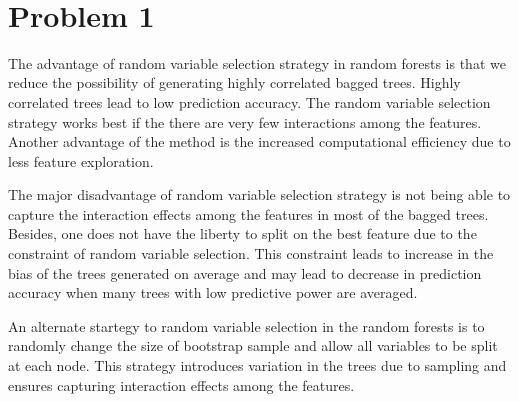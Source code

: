 \documentclass[11pt]{article}
\begin{document}
\begin{center}

\ \\
\end{center}

\section*{Problem 1}

\vspace{5 mm}
\noindent
The advantage of random variable selection strategy in random forests is that
we reduce the possibility of generating highly correlated bagged trees. Highly
correlated trees lead to low prediction accuracy. The random variable selection 
strategy works best if the there are very few interactions among the features.
Another advantage of the method is the increased computational efficiency due to
less feature exploration. 

The major disadvantage of random variable selection strategy is not being able to 
capture the interaction effects among the features in most of the bagged trees. 
Besides, one does not have the liberty to split on the best feature due to the constraint
of random variable selection. This constraint leads to increase in the bias of the trees
generated on average and may lead to decrease in prediction accuracy when many 
trees with low predictive power are averaged.

An alternate startegy to random variable selection in the random forests is to 
randomly change the size of bootstrap sample and allow all variables to be split at 
each node. This strategy introduces variation in the trees due to sampling and 
ensures capturing interaction effects among the features. 


\vspace{5 mm}
\noindent
\end{document}
